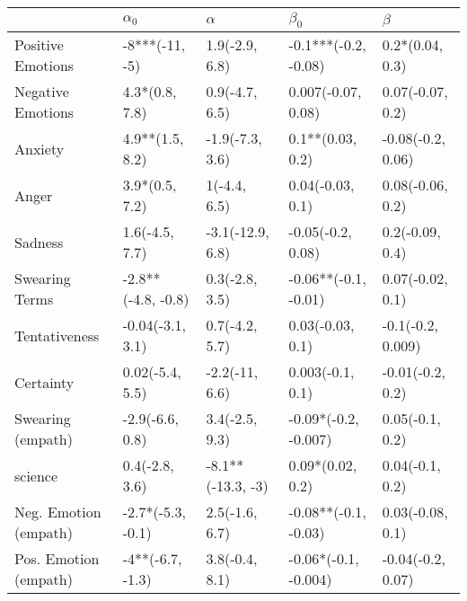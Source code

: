 \begin{tabular}{lllll}
\toprule
{} &          $\alpha_0$ &           $\alpha$ &             $\beta_0$ &            $\beta$ \\
\midrule
Positive Emotions     &      -8***(-11, -5) &     1.9(-2.9, 6.8) &  -0.1***(-0.2, -0.08) &    0.2*(0.04, 0.3) \\
Negative Emotions     &      4.3*(0.8, 7.8) &     0.9(-4.7, 6.5) &    0.007(-0.07, 0.08) &   0.07(-0.07, 0.2) \\
Anxiety               &     4.9**(1.5, 8.2) &    -1.9(-7.3, 3.6) &      0.1**(0.03, 0.2) &  -0.08(-0.2, 0.06) \\
Anger                 &      3.9*(0.5, 7.2) &       1(-4.4, 6.5) &      0.04(-0.03, 0.1) &   0.08(-0.06, 0.2) \\
Sadness               &      1.6(-4.5, 7.7) &   -3.1(-12.9, 6.8) &     -0.05(-0.2, 0.08) &    0.2(-0.09, 0.4) \\
Swearing Terms        &  -2.8**(-4.8, -0.8) &     0.3(-2.8, 3.5) &  -0.06**(-0.1, -0.01) &   0.07(-0.02, 0.1) \\
Tentativeness         &    -0.04(-3.1, 3.1) &     0.7(-4.2, 5.7) &      0.03(-0.03, 0.1) &  -0.1(-0.2, 0.009) \\
Certainty             &     0.02(-5.4, 5.5) &     -2.2(-11, 6.6) &      0.003(-0.1, 0.1) &   -0.01(-0.2, 0.2) \\
Swearing (empath)     &     -2.9(-6.6, 0.8) &     3.4(-2.5, 9.3) &  -0.09*(-0.2, -0.007) &    0.05(-0.1, 0.2) \\
science               &      0.4(-2.8, 3.6) &  -8.1**(-13.3, -3) &      0.09*(0.02, 0.2) &    0.04(-0.1, 0.2) \\
Neg. Emotion (empath) &   -2.7*(-5.3, -0.1) &     2.5(-1.6, 6.7) &  -0.08**(-0.1, -0.03) &   0.03(-0.08, 0.1) \\
Pos. Emotion (empath) &    -4**(-6.7, -1.3) &     3.8(-0.4, 8.1) &  -0.06*(-0.1, -0.004) &  -0.04(-0.2, 0.07) \\
\bottomrule
\end{tabular}
